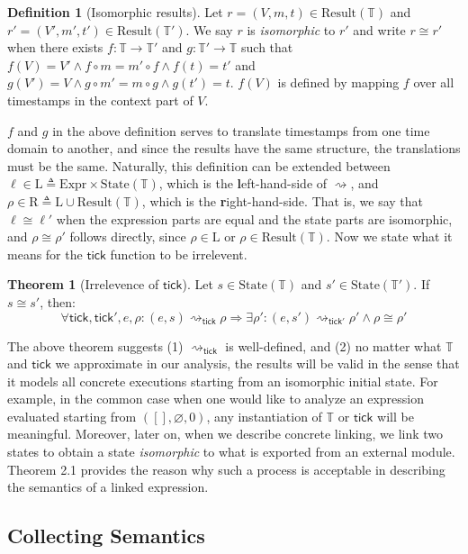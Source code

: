 \documentclass[acmsmall,review]{acmart}\settopmatter{printfolios=true,printccs=false,printacmref=false}
\theoremstyle{definition}
\newtheorem{definition}{Definition}[section]
\newtheorem{thm}{Theorem}[section]
\newcommand*{\Expr}{\text{Expr}}
\newcommand*{\Time}{\mathbb{T}}
\newcommand*{\Left}{\text{L}}
\newcommand*{\Right}{\text{R}}
\newcommand*{\mem}{m}
\newcommand*{\State}{\text{State}}
\newcommand*{\Result}{\text{Result}}
\newcommand*{\semarrow}{\rightsquigarrow}
\newcommand*{\tick}{\mathsf{tick}}
\begin{document}
\begin{definition}[Isomorphic results]
  Let $r=(V,\mem,t)\in\Result(\Time)$ and $r'=(V',\mem',t')\in\Result(\Time')$.
  We say $r$ is \emph{isomorphic} to $r'$ and write $r\cong r'$ when there exists $f:\Time\rightarrow\Time'$ and $g:\Time'\rightarrow\Time$ such that
  $f(V)=V'\wedge f\circ\mem=\mem'\circ f\wedge f(t)=t'$ and $g(V')=V\wedge g\circ\mem'=\mem\circ g\wedge g(t')=t$.
  $f(V)$ is defined by mapping $f$ over all timestamps in the context part of $V$.
\end{definition}

$f$ and $g$ in the above definition serves to translate timestamps from one time domain to another, and since the results have the same structure, the translations must be the same.
Naturally, this definition can be extended between $\ell\in\Left\triangleq\Expr\times\State(\Time)$, which is the \textbf{l}eft-hand-side of $\semarrow$, and $\rho\in\Right\triangleq\Left\cup\Result(\Time)$, which is the \textbf{r}ight-hand-side.
That is, we say that $\ell\cong\ell'$ when the expression parts are equal and the state parts are isomorphic, and
$\rho\cong\rho'$ follows directly, since $\rho\in\Left$ or $\rho\in\Result(\Time)$.
Now we state what it means for the $\tick$ function to be irrelevent.

\begin{thm}[Irrelevence of $\tick$]
  Let $s\in\State(\Time)$ and $s'\in\State(\Time')$.
  If $s\cong s'$, then:
  \[\forall\tick,\tick',e,\rho:(e,s)\semarrow_\tick\rho\Rightarrow\exists\rho':(e,s')\semarrow_{\tick'}\rho'\wedge\rho\cong\rho'\]
\end{thm}

The above theorem suggests (1) $\semarrow_\tick$ is well-defined, and (2) no matter what $\Time$ and $\tick$ we approximate in our analysis, the results will be valid in the sense that it models all concrete executions starting from an isomorphic initial state.
For example, in the common case when one would like to analyze an expression evaluated starting from $([],\varnothing,0)$, any instantiation of $\Time$ or $\tick$ will be meaningful.
Moreover, later on, when we describe concrete linking, we link two states to obtain a state \emph{isomorphic} to what is exported from an external module.
Theorem 2.1 provides the reason why such a process is acceptable in describing the semantics of a linked expression.

\subsection{Collecting Semantics}
\end{document}
